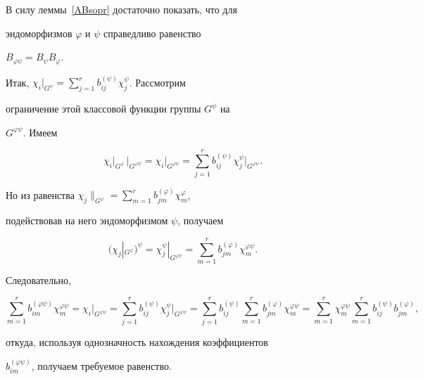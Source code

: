 \begin{pf} В силу леммы~\ref{ABsopr} достаточно показать, что для


эндоморфизмов $\varphi$ и $\psi$ справедливо равенство


$B_{\varphi\psi}=B_{\psi}B_{\varphi}$.





Итак, $\chi_{i}\big|_{{G^{\psi}}}=


\sum\limits^{r}_{j=1} b^{(\psi)}_{ij}\chi^{\psi}_{j}$. Рассмотрим


ограничение этой классовой функции группы $G^{\psi}$ на


$G^{\varphi\psi}$. Имеем


$$


\chi_{i}|_{{G^{\varphi}}}\,


\big|_{{G^{\varphi\psi}}}


=\chi_{i}\big|_{{G^{\varphi\psi}}}=\sum\limits^{r}_{j=1}


b^{(\psi)}_{ij}\chi^{\psi}_{j}\big|_{{G^{\varphi\psi}}}.


$$


Но из равенства $\chi_{j}\|_{{G^{\varphi}}}=


\sum\limits^{r}_{m=1} b^{(\varphi)}_{jm}\chi^{\varphi}_{m}$,


подействовав на него эндоморфизмом $\psi$, получаем


$$


(\chi_{j}|_{{G^{\varphi}}})^{\psi}=


\chi^{\psi}_{j}|_{{G^{\varphi\psi}}}=


\sum\limits^{r}_{m=1} b^{(\varphi)}_{jm}\chi^{\varphi\psi}_{m}.


$$


Следовательно,


$$


\sum\limits^{r}_{m=1} b^{(\varphi\psi)}_{im}\chi^{\varphi\psi}_{m}=


\chi_{i}\big|_{{G^{\varphi\psi}}}= \sum\limits^{r}_{j=1}


b^{(\psi)}_{ij}\chi^{\psi}_{j}\big|_{{G^{\varphi\psi}}}=


\sum\limits^{r}_{j=1} b^{(\psi)}_{ij} \sum\limits^{r}_{m=1}


b^{(\varphi)}_{jm}\chi^{\varphi\psi}_{m}=


\sum\limits^{r}_{m=1}\chi^{\varphi\psi}_{m}\sum^{r}_{m=1}


b^{(\psi)}_{ij}b^{(\varphi)}_{jm},


$$


откуда, используя однозначность нахождения коэффициентов


$b^{(\varphi\psi)}_{im}$, получаем требуемое равенство.


\end{pf}





